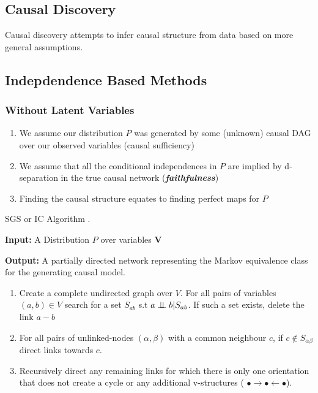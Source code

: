 \documentclass[b0,landscape,25pt]{sciposter}
\begin{document}
\begin{multicols}{5}
\section*{Causal Discovery}

Causal discovery attempts to infer causal structure from data based on more general assumptions. 

\subsection*{Indepdendence Based Methods}
\subsubsection*{Without Latent Variables}
\begin{enumerate}
\item We assume our distribution $P$ was generated by some (unknown) causal DAG over our observed variables (causal sufficiency) 
\item We assume that all the conditional independences in $P$ are implied by d-separation in the true causal network (\textbf{\textit{faithfulness}})
\item Finding the causal structure equates to finding perfect maps for $P$
\end{enumerate}

\begin{algorithm}
\caption{SGS or IC Algorithm \cite{Sprites,Pearl2000}. \label{alg:spect}}
\textbf{Input:} A Distribution $P$ over variables $\boldsymbol{V}$

\textbf{Output:} A partially directed network representing the Markov equivalence class for the generating causal model.
\begin{enumerate}
\item Create a complete undirected graph over $V$. For all pairs of variables $(a,b) \in V$ search for a set $S_{ab}$ s.t $a \perp\!\!\!\perp b|S_{ab}$. If such a set exists, delete the link $a-b$
\item For all pairs of unlinked-nodes $(\alpha, \beta)$ with a common neighbour $c$, if $c \notin S_{\alpha \beta}$ direct links towards $c$.
\item Recursively direct any remaining links for which there is only one orientation that does not create a cycle or any additional v-structures ( $\bullet \rightarrow \bullet \leftarrow \bullet$). 
\end{enumerate}
\end{algorithm}


\end{multicols}
\end{document}
